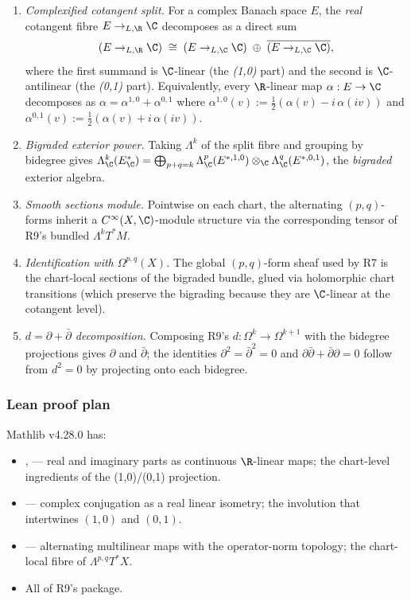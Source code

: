 \begin{enumerate}
\item \emph{Complexified cotangent split.}  For a complex Banach
  space \(E\), the \emph{real} cotangent fibre \(E\to_{L,\R}\C\)
  decomposes as a direct sum
  \[(E\to_{L,\R}\C) \;\cong\; (E\to_{L,\C}\C) \;\oplus\; \overline{(E\to_{L,\C}\C)},\]
  where the first summand is \(\C\)-linear (the \emph{(1,0)} part)
  and the second is \(\C\)-antilinear (the \emph{(0,1)} part).
  Equivalently, every \(\R\)-linear map \(\alpha:E\to\C\) decomposes
  as \(\alpha=\alpha^{1,0}+\alpha^{0,1}\) where
  \(\alpha^{1,0}(v):=\tfrac{1}{2}(\alpha(v)-i\,\alpha(iv))\) and
  \(\alpha^{0,1}(v):=\tfrac{1}{2}(\alpha(v)+i\,\alpha(iv))\).
\item \emph{Bigraded exterior power.}  Taking \(\Lambda^{k}\) of
  the split fibre and grouping by bidegree gives
  \(\Lambda^{k}_{\C}(E^{*}_{\C}) = \bigoplus_{p+q=k} \Lambda^{p}_{\C}(E^{*,1,0}) \otimes_{\C} \Lambda^{q}_{\C}(E^{*,0,1})\),
  the \emph{bigraded} exterior algebra.
\item \emph{Smooth sections module.}  Pointwise on each chart, the
  alternating \((p,q)\)-forms inherit a \(C^{\infty}(X,\C)\)-module
  structure via the corresponding tensor of R9's bundled
  \(\Lambda^{k}T^{*}M\).
\item \emph{Identification with \(\Omega^{p,q}(X)\).}  The
  global \((p,q)\)-form sheaf used by R7 is the chart-local sections
  of the bigraded bundle, glued via holomorphic chart transitions
  (which preserve the bigrading because they are \(\C\)-linear at
  the cotangent level).
\item \emph{\(d=\partial+\bar\partial\) decomposition.}  Composing
  R9's \(d:\Omega^{k}\to\Omega^{k+1}\) with the bidegree
  projections gives \(\partial\) and \(\bar\partial\); the
  identities \(\partial^{2}=\bar\partial^{2}=0\) and
  \(\partial\bar\partial+\bar\partial\partial=0\) follow from
  \(d^{2}=0\) by projecting onto each bidegree.
\end{enumerate}

\subsubsection*{Lean proof plan}

Mathlib v4.28.0 has:
\begin{itemize}
\item {},  --- real and
  imaginary parts as continuous \(\R\)-linear maps; the chart-level
  ingredients of the (1,0)/(0,1) projection.
\item {} --- complex conjugation as a real linear
  isometry; the involution that intertwines \((1,0)\) and \((0,1)\).
\item {} --- alternating multilinear
  maps with the operator-norm topology; the chart-local fibre of
  \(\Lambda^{p,q}T^{*}X\).
\item All of R9's  package.
\end{itemize}

